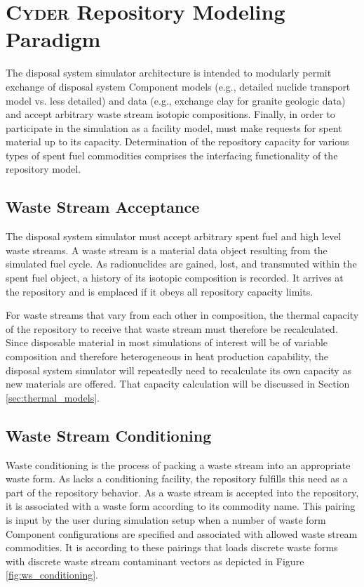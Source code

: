 \section{\textsc{Cyder} Repository Modeling Paradigm}

The \Cyder disposal system simulator architecture is intended to modularly permit 
exchange of disposal system Component models (e.g., detailed nuclide transport 
model vs. less detailed) and data (e.g., exchange clay for granite geologic 
data) and accept arbitrary waste stream isotopic compositions.  
Finally, in order to participate in the simulation as a facility model, \Cyder must 
make requests for spent material up to its capacity. Determination of the 
repository capacity for various types of spent fuel commodities comprises the 
interfacing functionality of the repository model.

\subsection{Waste Stream Acceptance}

The disposal system simulator must accept arbitrary spent fuel and high level waste 
streams. A waste stream is a material data object resulting from the \Cyclus 
simulated fuel cycle.  As radionuclides are gained, lost, and transmuted within 
the spent fuel object, a history of its isotopic composition is recorded.  It 
arrives at the repository and is emplaced if it obeys all repository capacity 
limits. 

For waste streams that vary from each other in composition, the thermal 
capacity of the repository to receive that waste stream must therefore be 
recalculated.  Since disposable material in most simulations of interest will 
be of variable composition and therefore heterogeneous in heat production 
capability, the disposal system simulator will repeatedly need to recalculate its own 
capacity as new materials are offered.  That capacity calculation will be 
discussed in Section \ref{sec:thermal_models}. 

\subsection{Waste Stream Conditioning}

Waste conditioning is the process of packing a waste stream into an appropriate 
waste form. As \Cyclus lacks a conditioning facility, the \Cyder repository 
fulfills this need as a part of the repository behavior. As a waste stream is 
accepted into the repository, it is associated with a waste form according 
to its commodity name. This pairing is input by the user during simulation 
setup when a number of waste form Component configurations are specified and 
associated with allowed waste stream commodities. It is according to these 
pairings that \Cyder loads discrete waste forms with discrete waste 
stream contaminant vectors as depicted in Figure \ref{fig:ws_conditioning}.

